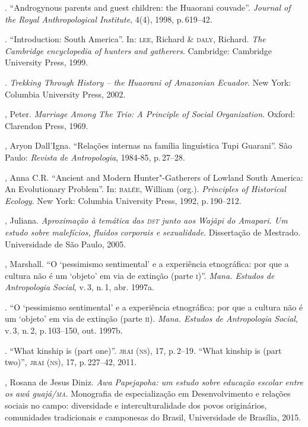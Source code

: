 \begin{bibliohedra}
\titidem. ``Androgynous parents and guest children: the Huaorani
couvade''. \emph{Journal of the Royal Anthropological Institute}, 4(4), 1998, p.\,619--42.

\titidem. ``Introduction: South America''. In: \textsc{lee}, Richard \& \textsc{daly}, Richard. \emph{The Cambridge encyclopedia of hunters and gatherers}.
Cambridge: Cambridge University Press, 1999.

\titidem. \emph{Trekking Through History -- the Huaorani of
Amazonian Ecuador}. New York: Columbia University Press, 2002.

, Peter. \emph{Marriage Among The Trio: A Principle of Social
Organization}. Oxford: Clarendon Press, 1969.

, Aryon Dall'Igna. ``Relações internas na família linguística Tupi
Guarani''. São Paulo: \emph{Revista de Antropologia}, 1984-85, p.\,27--28.

, Anna C.R. ``Ancient and Modern Hunter"-Gatherers of Lowland South
America: An Evolutionary Problem''. In: \textsc{balée}, William (org.).
\emph{Principles of Historical Ecology}. New York: Columbia
University Press, 1992, p.\,190--212.

, Juliana. \emph{Aproximação à temática das \textsc{dst} junto aos Wajãpi do
Amapari. Um estudo sobre malefícios, fluidos corporais e sexualidade}.
Dissertação de Mestrado. Universidade de São Paulo, 2005.

, Marshall. ``O `pessimismo sentimental' e a experiência
etnográfica: por que a cultura não é um `objeto' em via de extinção
(parte \textsc{i})''. \emph{Mana. Estudos de Antropologia Social}, v.\,3,
n.\,1, abr. 1997a.

\titidem. ``O `pessimismo sentimental' e a experiência
etnográfica: por que a cultura não é um `objeto' em via de extinção
(parte \textsc{ii}). \emph{Mana. Estudos de Antropologia Social}, v.\,3,
n.\,2, p.\,103--150, out. 1997b.

\titidem. ``What kinship is (part one)''. \textsc{jrai} (\textsc{ns}), 17, p.\,2--19.
``What kinship is (part two)'', \textsc{jrai} (\textsc{ns}), 17, p.\,227--42, 2011.

, Rosana de Jesus Diniz. \emph{Awa Papejapoha: um estudo sobre educação escolar
entre os awá guajá/\textsc{ma}}. Monografia de especialização em Desenvolvimento
e relações sociais no campo: diversidade e interculturalidade dos povos
originários, comunidades tradicionais e camponesas do Brasil,
Universidade de Brasília, 2015.


\end{bibliohedra}
